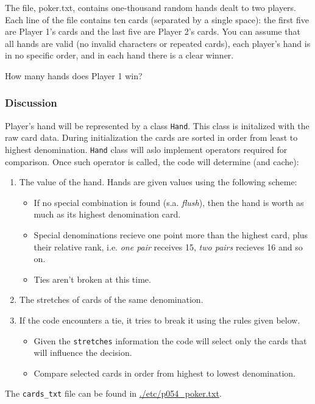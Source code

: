 \documentclass[11pt]{article}
\begin{document}
The file, poker.txt, contains one-thousand random hands dealt to two
players. Each line of the file contains ten cards (separated by a single
space): the first five are Player 1's cards and the last five are Player 2's
cards. You can assume that all hands are valid (no invalid characters or
repeated cards), each player's hand is in no specific order, and in each
hand there is a clear winner.

How many hands does Player 1 win?

\subsubsection{Discussion}
\label{sec:orgheadline15}
Player's hand will be represented by a class \texttt{Hand}.  This class is
initalized with the raw card data.  During initialization the cards are
sorted in order from least to highest denomination.  \texttt{Hand} class will aslo
implement operators required for comparison.  Once such operator is called,
the code will determine (and cache):

\begin{enumerate}
\item The value of the hand.  Hands are given values using the following scheme:
\begin{itemize}
\item If no special combination is found (s.a. \emph{flush}), then the hand is
worth as much as its highest denomination card.
\item Special denominations recieve one point more than the highest card,
plus their relative rank, i.e. \emph{one pair} receives 15, \emph{two pairs}
recieves 16 and so on.
\item Ties aren't broken at this time.
\end{itemize}
\item The stretches of cards of the same denomination.
\item If the code encounters a tie, it tries to break it using the rules given
below.
\begin{itemize}
\item Given the \texttt{stretches} information the code will select only the cards
that will influence the decision.
\item Compare selected cards in order from highest to lowest denomination.
\end{itemize}
\end{enumerate}

The \texttt{cards\_txt} file can be found in \url{./etc/p054_poker.txt}.
\end{document}

